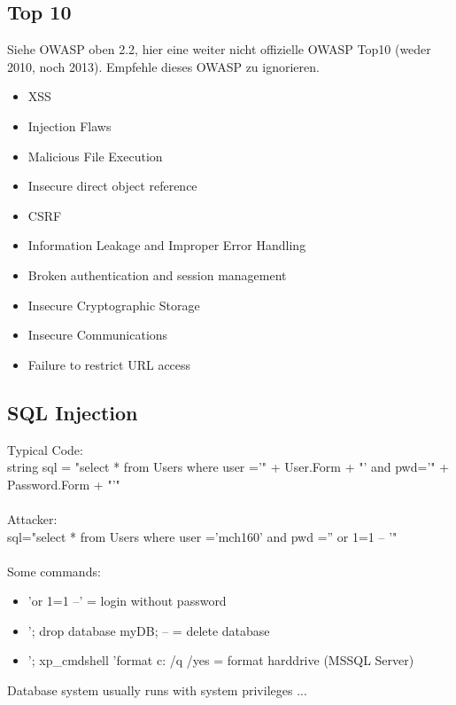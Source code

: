 \documentclass[a4paper, 12pt]{article}
\begin{document}
\subsection{Top 10}
Siehe OWASP oben 2.2, hier eine weiter nicht offizielle OWASP Top10 (weder 2010, noch 2013). Empfehle dieses OWASP zu ignorieren.
\begin{itemize}
\item XSS
\item Injection Flaws
\item Malicious File Execution
\item Insecure direct object reference
\item CSRF
\item Information Leakage and Improper Error Handling
\item Broken authentication and session management
\item Insecure Cryptographic Storage
\item Insecure Communications
\item Failure to restrict URL access
\end{itemize}
\subsection{SQL Injection}
Typical Code: \\
string sql = "select * from Users where user ='" +
User.Form + "' and pwd='" + Password.Form + "'"\\\\
Attacker: \\
sql="select * from Users where user ='mch160' and pwd
='' or 1=1 -- '"\\\\

Some commands:
\begin{itemize}
\item 'or 1=1 --'   = login without password
\item '; drop database myDB; --   = delete database
\item '; xp\_cmdshell 'format c: /q /yes   = format harddrive (MSSQL Server)
\end{itemize}
Database system usually runs with system privileges ...
\end{document}
